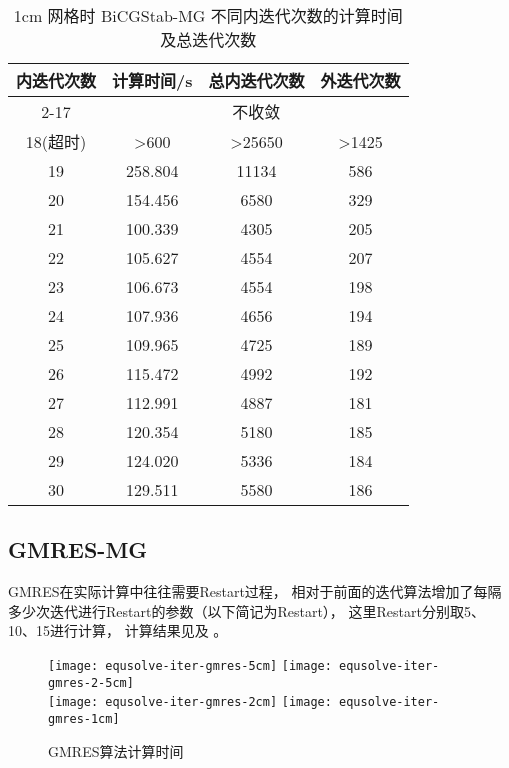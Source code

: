 \begin{datasheet}
\begin{table}
\centering
\caption{1cm 网格时 BiCGStab-MG 不同内迭代次数的计算时间及总迭代次数}
\label{tab:equsolve.iter.bicgstab-mg.1cm}
\begin{tabular}{cccc}
\toprule
内迭代次数 & 计算时间/s & 总内迭代次数 & 外迭代次数\\
\midrule
2-17 & \multicolumn{3}{c}{不收敛} \\ %
18(超时) & >600 & >25650 & >1425 \\ %
19 & 258.804 & 11134 & 586\\
20 & 154.456 & 6580 & 329\\
21 & 100.339 & 4305 & 205\\
22 & 105.627 & 4554 & 207\\
23 & 106.673 & 4554 & 198\\
24 & 107.936 & 4656 & 194\\
25 & 109.965 & 4725 & 189\\
26 & 115.472 & 4992 & 192\\
27 & 112.991 & 4887 & 181\\
28 & 120.354 & 5180 & 185\\
29 & 124.020 & 5336 & 184\\
30 & 129.511 & 5580 & 186\\
\bottomrule
\end{tabular}
\end{table}

\end{datasheet}

\subsection{GMRES-MG}
GMRES在实际计算中往往需要Restart过程，
相对于前面的迭代算法增加了每隔多少次迭代进行Restart的参数（以下简记为Restart），
这里Restart分别取5、10、15进行计算，
计算结果见及
。

\begin{figure}
\centering
{}
{\texttt{[image: equsolve-iter-gmres-5cm]}}
{\texttt{[image: equsolve-iter-gmres-2-5cm]}}
\\[1cm]
{\texttt{[image: equsolve-iter-gmres-2cm]}}
{\texttt{[image: equsolve-iter-gmres-1cm]}}
\caption{\label{fig:fig:equsolve.iter.gmres}GMRES算法计算时间}
\end{figure}

